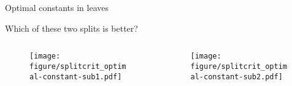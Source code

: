 \documentclass[11pt,compress,t,notes=noshow, xcolor=table]{beamer}
\begin{document}
\begin{vbframe}{Optimal constants in leaves}

Which of these two splits is better?

\begin{columns}
\begin{column}{0.5\textwidth}

\color{fgcolor}

\begin{figure}
\texttt{[image: figure/splitcrit\_optimal-constant-sub1.pdf]} 
\end{figure}

 
\end{column}
\begin{column}{0.5\textwidth}

\begin{figure}
\texttt{[image: figure/splitcrit\_optimal-constant-sub2.pdf]} 
\end{figure}

\end{column}
\end{columns}

\end{vbframe}
\end{document}
